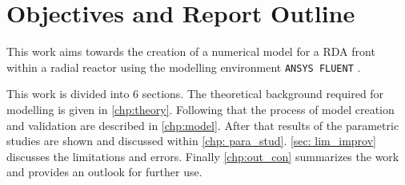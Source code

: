 \documentclass[../thesis.tex]{subfiles}
\begin{document}
\section{Objectives and Report Outline}

This work aims towards the creation of a numerical model for a RDA front within a radial reactor using the modelling environment \texttt{ANSYS FLUENT} \cite{manual2009ansys}. 

This work is divided into 6 sections. The theoretical background required for modelling is given in \autoref{chp:theory}. Following that the process of model creation and validation are described in \autoref{chp:model}. After that results of the parametric studies are shown and discussed within \autoref{chp: para_stud}. \autoref{sec: lim_improv} discusses the limitations and errors. Finally \autoref{chp:out_con} summarizes the work and provides an outlook for further use.
\end{document}
